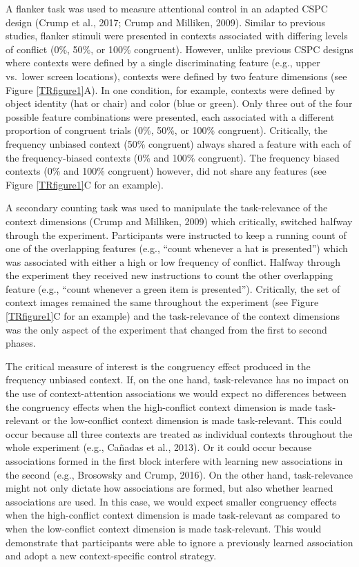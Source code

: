 \documentclass[]{DissertateCUNY}
\begin{document}
A flanker task was used to measure attentional control in an adapted
CSPC design (Crump et al., 2017; Crump and Milliken, 2009). Similar to
previous studies, flanker stimuli were presented in contexts associated
with differing levels of conflict (0\%, 50\%, or 100\% congruent).
However, unlike previous CSPC designs where contexts were defined by a
single discriminating feature (e.g., upper vs.~lower screen locations),
contexts were defined by two feature dimensions (see Figure
\ref{TRfigure1}A). In one condition, for example, contexts were defined
by object identity (hat or chair) and color (blue or green). Only three
out of the four possible feature combinations were presented, each
associated with a different proportion of congruent trials (0\%, 50\%,
or 100\% congruent). Critically, the frequency unbiased context (50\%
congruent) always shared a feature with each of the frequency-biased
contexts (0\% and 100\% congruent). The frequency biased contexts (0\%
and 100\% congruent) however, did not share any features (see Figure
\ref{TRfigure1}C for an example).

A secondary counting task was used to manipulate the task-relevance of
the context dimensions (Crump and Milliken, 2009) which critically,
switched halfway through the experiment. Participants were instructed to
keep a running count of one of the overlapping features (e.g., ``count
whenever a hat is presented'') which was associated with either a high
or low frequency of conflict. Halfway through the experiment they
received new instructions to count the other overlapping feature (e.g.,
``count whenever a green item is presented''). Critically, the set of
context images remained the same throughout the experiment (see Figure
\ref{TRfigure1}C for an example) and the task-relevance of the context
dimensions was the only aspect of the experiment that changed from the
first to second phases.

The critical measure of interest is the congruency effect produced in
the frequency unbiased context. If, on the one hand, task-relevance has
no impact on the use of context-attention associations we would expect
no differences between the congruency effects when the high-conflict
context dimension is made task-relevant or the low-conflict context
dimension is made task-relevant. This could occur because all three
contexts are treated as individual contexts throughout the whole
experiment (e.g., Cañadas et al., 2013). Or it could occur because
associations formed in the first block interfere with learning new
associations in the second (e.g., Brosowsky and Crump, 2016). On the
other hand, task-relevance might not only dictate how associations are
formed, but also whether learned associations are used. In this case, we
would expect smaller congruency effects when the high-conflict context
dimension is made task-relevant as compared to when the low-conflict
context dimension is made task-relevant. This would demonstrate that
participants were able to ignore a previously learned association and
adopt a new context-specific control strategy.
\end{document}
